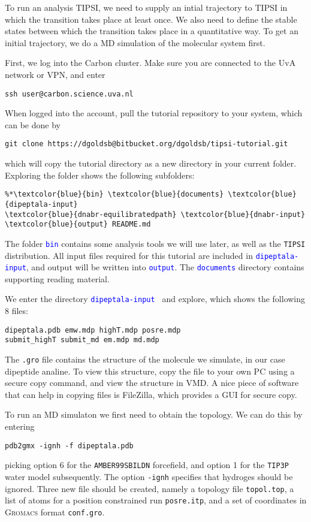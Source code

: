 \documentclass[]{article}
\begin{document}
To run an analysis \textsc{TIPSI}, we need to supply an intial trajectory to \textsc{TIPSI} in which the transition takes place at least once. We also need to define the stable states between which the transition takes place in a quantitative way. To get an initial trajectory, we do a MD simulation of the molecular system first.

First, we log into the Carbon cluster. Make sure you are connected to the UvA network or VPN, and enter
%
\begin{lstlisting}
ssh user@carbon.science.uva.nl
\end{lstlisting}
%
When logged into the account, pull the tutorial repository to your system, which can be done by
%
\begin{lstlisting}
git clone https://dgoldsb@bitbucket.org/dgoldsb/tipsi-tutorial.git
\end{lstlisting}
%
which will copy the tutorial directory as a new directory in your current folder. Exploring the folder shows the following subfolders:
%
\begin{lstlisting}
%*\textcolor{blue}{bin} \textcolor{blue}{documents} \textcolor{blue}{dipeptala-input} 
\textcolor{blue}{dnabr-equilibratedpath} \textcolor{blue}{dnabr-input} \textcolor{blue}{output} README.md
\end{lstlisting}
%
The folder \texttt{\textcolor{blue}{bin}} contains some analysis tools we will use later, as well as the \texttt{TIPSI} distribution. All input files required for this tutorial are included in \texttt{\textcolor{blue}{dipeptala-input}}, and output will be written into \texttt{\textcolor{blue}{output}}. The \texttt{\textcolor{blue}{documents}} directory contains supporting reading material.

We enter the directory \texttt{\textcolor{blue}{dipeptala-input} } and explore, which shows the following 8 files:
%
\begin{lstlisting}
dipeptala.pdb emw.mdp highT.mdp posre.mdp 
submit_highT submit_md em.mdp md.mdp
\end{lstlisting}
%
The \texttt{.gro} file contains the structure of the molecule we simulate, in our case dipeptide analine. To view this structure, copy the file to your own PC using a secure copy command, and view the structure in VMD. A nice piece of software that can help in copying files is FileZilla, which provides a GUI for secure copy.

To run an MD simulaton we first need to obtain the topology. We can do this by entering
%
\begin{lstlisting}
pdb2gmx -ignh -f dipeptala.pdb
\end{lstlisting}
%
picking option 6 for the \texttt{AMBER99SBILDN} forcefield, and option 1 for the \texttt{TIP3P} water model subsequently. The option \texttt{-ignh} specifies that hydroges should be ignored. Three new file should be created, namely a topology file \texttt{topol.top}, a list of atoms for a position constrained run \texttt{posre.itp}, and a set of coordinates in \textsc{Gromacs} format \texttt{conf.gro}. 
\end{document}
